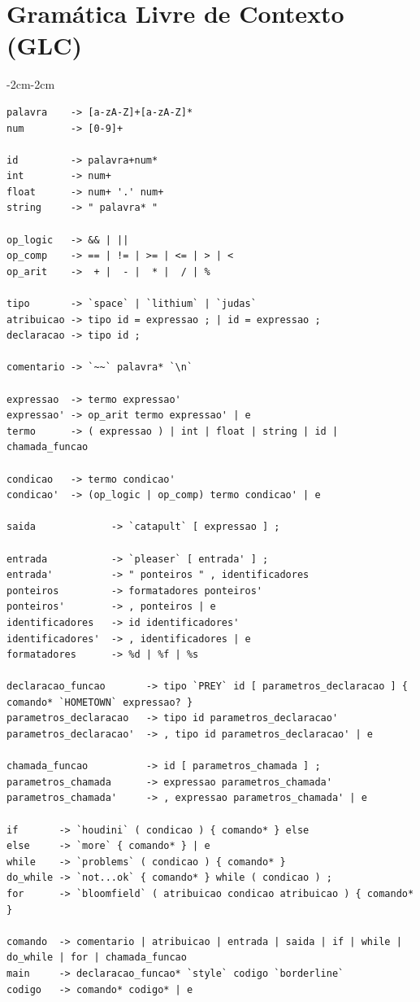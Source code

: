 \documentclass[a4paper,12pt]{article}
\begin{document}
\section{Gramática Livre de Contexto (GLC)}
\begin{adjustwidth}{-2cm}{-2cm}
\begin{lstlisting}[basicstyle=\ttfamily\footnotesize]
palavra    -> [a-zA-Z]+[a-zA-Z]*
num        -> [0-9]+

id         -> palavra+num*
int        -> num+
float      -> num+ '.' num+
string     -> " palavra* "

op_logic   -> && | ||
op_comp    -> == | != | >= | <= | > | <
op_arit    ->  + |  - |  * |  / | %

tipo       -> `space` | `lithium` | `judas`
atribuicao -> tipo id = expressao ; | id = expressao ;
declaracao -> tipo id ;

comentario -> `~~` palavra* `\n`

expressao  -> termo expressao'
expressao' -> op_arit termo expressao' | e
termo      -> ( expressao ) | int | float | string | id | chamada_funcao

condicao   -> termo condicao'
condicao'  -> (op_logic | op_comp) termo condicao' | e

saida             -> `catapult` [ expressao ] ;

entrada           -> `pleaser` [ entrada' ] ;
entrada'          -> " ponteiros " , identificadores
ponteiros         -> formatadores ponteiros'
ponteiros'        -> , ponteiros | e
identificadores   -> id identificadores'
identificadores'  -> , identificadores | e
formatadores      -> %d | %f | %s

declaracao_funcao       -> tipo `PREY` id [ parametros_declaracao ] { comando* `HOMETOWN` expressao? }
parametros_declaracao   -> tipo id parametros_declaracao'
parametros_declaracao'  -> , tipo id parametros_declaracao' | e

chamada_funcao          -> id [ parametros_chamada ] ;
parametros_chamada      -> expressao parametros_chamada'
parametros_chamada'     -> , expressao parametros_chamada' | e

if       -> `houdini` ( condicao ) { comando* } else
else     -> `more` { comando* } | e
while    -> `problems` ( condicao ) { comando* }
do_while -> `not...ok` { comando* } while ( condicao ) ;
for      -> `bloomfield` ( atribuicao condicao atribuicao ) { comando* }

comando  -> comentario | atribuicao | entrada | saida | if | while | do_while | for | chamada_funcao
main     -> declaracao_funcao* `style` codigo `borderline`
codigo   -> comando* codigo* | e
\end{lstlisting}
\end{adjustwidth}
\end{document}
